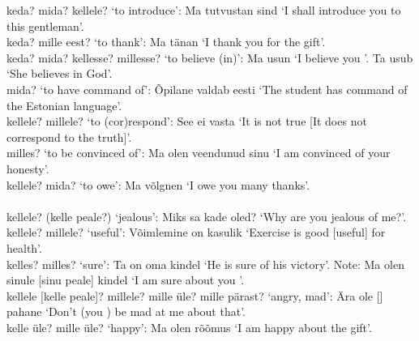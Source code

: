  keda? mida? kellele? `to introduce': Ma tutvustan sind  `I shall introduce you to this gentleman'. \\

 keda? mille eest? `to thank': Ma tänan  `I thank you \pl for the gift'. \\

 keda? mida? kellesse? millesse? `to believe (in)': Ma usun  `I believe you \sing'. Ta usub  `She believes in God'. \\

 mida? `to have command of': Õpilane valdab eesti  `The student has command of the Estonian language'. \\

 kellele? millele? `to (cor)respond': See ei vasta  `It is not true [It does not correspond to the truth]'. \\

 milles? `to be convinced of': Ma olen veendunud sinu  `I am convinced of your \sing honesty'. \\

 kellele? mida? `to owe': Ma võlgnen  `I owe you \sing many thanks'. \\

\newSection {} \\

 kellele? (kelle peale?) `jealous': Miks sa  kade oled? `Why are you \sing jealous of me?'.\\

 kellele? millele? `useful': Võimlemine on  kasulik `Exercise is good [useful] for health'. \\

 kelles? milles? `sure': Ta on oma  kindel `He is sure of his victory'. Note: Ma olen sinule [sinu peale] kindel `I am sure about you \sing'. \\

 kellele [kelle peale]? millele? mille üle? mille pärast? `angry, mad': Ära ole  []  pahane `Don't (you \sing) be mad at me about that'. \\

 kelle üle? mille üle? `happy': Ma olen rõõmus  `I am happy about the gift'. \\


